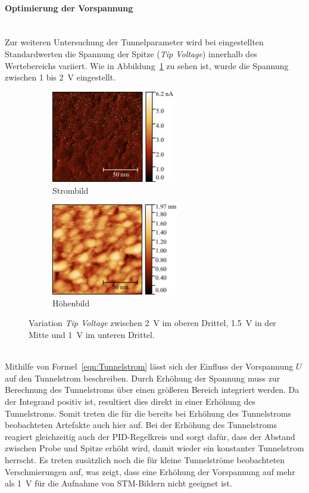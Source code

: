 \documentclass[a4paper,twoside,final]{article}
\begin{document}
\paragraph{Optimierung der Vorspannung}$~$\\
Zur weiteren Untersuchung der Tunnelparameter wird bei eingestellten Standardwerten die Spannung der Spitze (\textit{Tip Voltage}) innerhalb des Wertebereichs variiert. Wie in Abbildung~\ref{fig:Spannungsvariation} zu sehen ist, wurde die Spannung zwischen 1 bis \SI{2}{\volt} eingestellt.
\begin{figure}[htp]
    \centering
    \begin{subfigure}{0.45\textwidth}
        \includegraphics[height=4cm]{Bilder/Image01960_Spannungsvariation_Strom.pdf}
        \caption{Strombild}
    \end{subfigure}
    \hspace{0.5cm}
    \begin{subfigure}{0.45\textwidth}
        \includegraphics[height=4cm]{Bilder/Image01960_Spannungsvariation.pdf}
        \caption{Höhenbild}
    \end{subfigure}
    \caption{Variation \textit{Tip Voltage} zwischen \SI{2}{\volt} im oberen Drittel, \SI{1.5}{\volt} in der Mitte und \SI{1}{\volt} im unteren Drittel.}
    \label{fig:Spannungsvariation}
\end{figure}\\
Mithilfe von Formel~\eqref{eqn:Tunnelstrom} lässt sich der Einfluss der Vorspannung $U$ auf den Tunnelstrom beschreiben. Durch Erhöhung der Spannung muss zur Berechnung des Tunnelstroms über einen größeren Bereich integriert werden. Da der Integrand positiv ist, resultiert dies direkt in einer Erhöhung des Tunnelstroms. Somit treten die für die bereits bei Erhöhung des Tunnelstroms beobachteten Artefakte auch hier auf. Bei der Erhöhung des Tunnelstroms reagiert gleichzeitig auch der PID-Regelkreis und sorgt dafür, dass der Abstand zwischen Probe und Spitze erhöht wird, damit wieder ein konstanter Tunnelstrom herrscht. Es treten zusätzlich noch die für kleine Tunnelströme beobachteten Verschmierungen auf, was zeigt, dass eine Erhöhung der Vorspannung auf mehr als \SI{1}{\volt} für die Aufnahme von STM-Bildern nicht geeignet ist.\\
\end{document}
